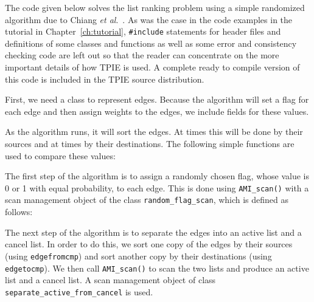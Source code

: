 The code given below solves the list ranking problem using a simple
randomized algorithm due to Chiang {\em et al}.~\cite{chiang:external}.
As was the case in the code examples in the tutorial in
Chapter~\ref{ch:tutorial}, \lstinline|#include| statements
for header files and definitions of some classes and functions as well
as some error and consistency checking code are left out so that the
reader can concentrate on the more important details of how TPIE is
used.  A complete ready to compile version of this code is included in
the TPIE source distribution.

First, we need a class to represent edges.  Because the algorithm will
set a flag for each edge and then assign weights to the edges, we
include fields for these values.



As the algorithm runs, it will sort the edges.  At times this will be
done by their sources and at times by their destinations.  The
following simple functions are used to compare these values:



The first step of the algorithm is to assign a randomly chosen flag,
whose value is 0 or 1 with equal probability, to each edge.  This is
done using \lstinline|AMI_scan()| with a scan management object of the
class \lstinline|random_flag_scan|, which is defined as follows:



The next step of the algorithm is to separate the edges into an active
list and a cancel list.  In order to do this, we sort one copy of the
edges by their sources (using \lstinline|edgefromcmp|) and sort another copy by
their destinations (using \lstinline|edgetocmp|).  We then call
\lstinline|AMI_scan()| to scan the two lists and produce an active list and
a cancel list.  A scan management object of class
\lstinline|separate_active_from_cancel| is used.



